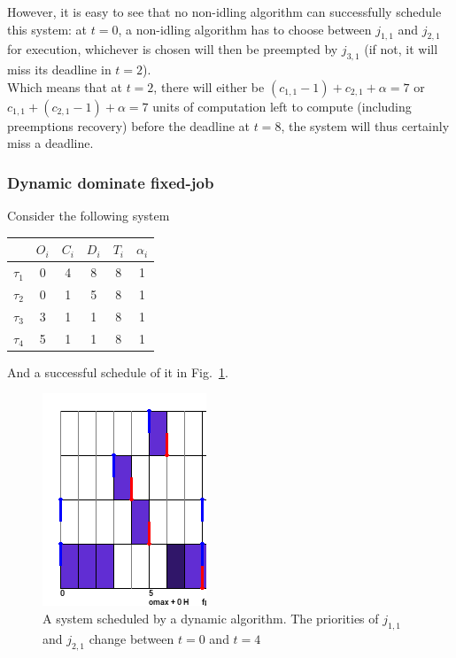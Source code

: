 \documentclass[a4paper,10pt]{article}
\begin{document}
        However, it is easy to see that no non-idling algorithm can successfully schedule this system: at $t=0$, a non-idling algorithm has to choose between $j_{1,1}$ and $j_{2,1}$ for execution, whichever is chosen will then be preempted by $j_{3,1}$ (if not, it will miss its deadline in $t=2$).\\

        Which means that at $t=2$, there will either be \mbox{$(c_{1,1} - 1) +c_{2,1} + \alpha = 7$} or \mbox{$c_{1,1} + (c_{2,1} -1) + \alpha = 7$} units of computation left to compute (including preemptions recovery) before the deadline at $t=8$, the system will thus certainly miss a deadline.


        \subsubsection{Dynamic dominate fixed-job}

        Consider the following system

        \begin{center}
            \begin{tabular}{|r|c|c|c|c|c|}
                \hline
                            & $O_i$ & $C_i$ & $D_i$ & $T_i$ & $\alpha_i$ \\ \hline
                $\tau_1$    & 0     & 4     & 8    & 8     & 1     \\ \hline
                $\tau_2$    & 0     & 1     & 5    & 8     & 1     \\ \hline
                $\tau_3$    & 3     & 1     & 1    & 8     & 1     \\ \hline
                $\tau_4$    & 5     & 1     & 1    & 8     & 1     \\ \hline
            \end{tabular}
        \end{center}

        And a successful schedule of it in Fig.~\ref{fig:dponly_pallf}.

        \begin{figure}[H]
        \begin{center}
            \includegraphics[scale=0.7]{figs/dponly_palff.png}
            \caption{A system scheduled by a dynamic algorithm. The priorities of $j_{1,1}$ and $j_{2,1}$ change between $t=0$ and $t=4$}
            \label{fig:dponly_pallf}
        \end{center}
        \end{figure}
\end{document}
